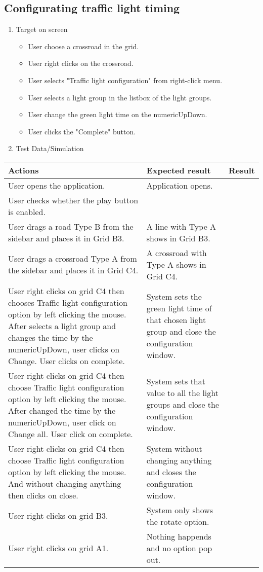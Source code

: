 \newpage

\subsection{Configurating traffic light timing}

\begin{enumerate}

	\item Target on screen
	\begin{itemize}
		\item User choose a crossroad in the grid.
		\item User right clicks on the crossroad.
		\item User selects "Traffic light configuration" from right-click menu.
		\item User selects a light group in the listbox of the light groups.
		\item User change the green light time on the numericUpDown.
		\item User clicks the "Complete" button. 
	\end{itemize}
	\item Test Data/Simulation
\end{enumerate}	
	\begin{tabularx}{\textwidth}{|X|X|p{2.5cm}|}\hline
		Actions & Expected result & Result \\\hline
		User opens the application.& Application opens. &  \pass \\\hline
		User checks whether the play button is enabled. & &  \pass \\\hline
		User drags a road Type B from the sidebar and places it in Grid B3. & A line with Type A shows in Grid B3. & \pass \\\hline
		User drags a crossroad Type A from the sidebar and places it in Grid C4. & A crossroad with Type A shows in Grid C4. & \pass \\\hline
		User right clicks on grid C4 then chooses Traffic light configuration  option by left clicking the mouse. After selects a light group and changes the time by the numericUpDown, user clicks on Change. User clicks on complete. & System sets the green light time of that chosen light group and close the configuration window.  & \pass \\\hline
		User right clicks on grid C4 then choose Traffic light configuration option by left clicking the mouse. After changed the time by the numericUpDown, user click on Change all. User click on complete. & System sets that value to all the light groups and close the configuration window. & \pass \\\hline
		User right clicks on grid C4 then choose Traffic light configuration option by left clicking the mouse. And without changing anything then clicks on close. & System without changing anything and closes the configuration window. & \pass \\\hline
		User right clicks on grid B3. & System only shows the rotate option. & \pass \\\hline
		User right clicks on grid A1. & Nothing happends and no option pop out. & \pass \\\hline
	\end{tabularx}
